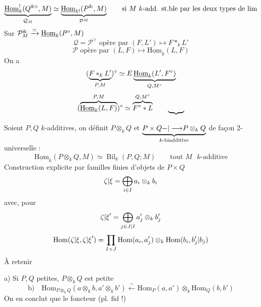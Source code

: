 \[
\underbrace{\underline{\mathrm{Hom}}_k^!(Q^{{\&}\circ},M)}_{\mathcal Q_M}
\simeq
\underbrace{\underline{\mathrm{Hom}}_{k!}(P^{{\&}},M)}_{\mathcal P^M}
\qquad\text{si }M\text{ $k$-add. st.{ble} par les deux types de lim}
\]
Sur $\mathcal P_M^{{{\&}}}\xrightarrow{\simeq}
\underline{\mathrm{Hom}}_k(P^\circ,M)$
\[
\mathcal Q=\mathcal P^\vee\text{ opère par }(F,L')\longmapsto F*_kL'
\]
\[
\mathcal P\text{ opère par }(L,F)\longmapsto\underline{\mathrm{Hom}}_k(L,F)
\]
On a
\[
(\underbrace{F*_kL'}_{P,M})^\circ\simeq{{E}}
\underbrace{\underline{\mathrm{Hom}}_k(L',F^\circ)}_{Q,M^\circ}
\]
\[
(\overbrace{\underline{\mathrm{Hom}}_k(L,F)}^{P,M})^\circ
\simeq\overbrace{F^\circ*L}^{Q,M^\circ}
\qquad{{\underbrace{\phantom{Hom}}}}
\]

Soient $P,Q$ $k$-additives, on définit $P\otimes_kQ$ et
$\underbrace{P\times Q{-|\longrightarrow}P\otimes_kQ}_{k\text{-biadditive}}$
de façon 2-universelle :
\[
\underline{\mathrm{Hom}}_k(P\otimes_kQ,M)\simeq\operatorname{Bil}_k(P,Q;M)
\qquad\text{tout }M\text{ $k$-additive}
\]
Construction explicite par familles finies d'objets de $P\times Q$
\[
{\zeta|\xi}=\bigoplus_{i\in I}a_i\otimes_k b_i
\]
avec, pour
\[
{\zeta|\xi}'=\bigoplus_{j\in{J|I}}a'_j\otimes_k b'_j
\]
\[
\mathrm{Hom}({\zeta|\xi},{\zeta|\xi}')=
\prod_{I\times J}\mathrm{Hom}(a_i,a'_j)\otimes_k\mathrm{Hom}(b_i,{b'_j|b_j})
\]
À retenir

 a) Si $P,Q$ petites, $P\otimes_kQ$ est petite
\[
\text{b)}\quad
\mathrm{Hom}_{P\otimes_kQ}(a\otimes_kb,a'\otimes_kb')
\xleftarrow{\sim}\mathrm{Hom}_P(a,a')\otimes_k\mathrm{Hom}_Q(b,b')
\]
On en conclut que le foncteur  (pl. fid !)
